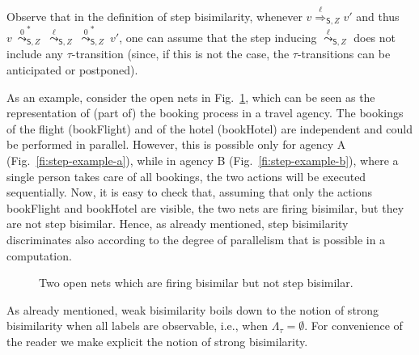 \documentclass{LMCS}
\newcommand{\wltr}[3][x]{\ensuremath{\stackrel{{#3}}{\leadsto}_{\mathsf{#1},#2}}}
\newcommand{\wltrStar}[3][x]{\ensuremath{\stackrel{{#3}}{\leadsto}^*_{\mathsf{#1},#2}}}
\newcommand{\Ltr}[3][x]{\ensuremath{\stackrel{{#3}}{\Longrightarrow}_{\mathsf{#1},#2}}}
\begin{document}
Observe that in the definition of step bisimilarity, whenever $v
\Ltr[S]{Z}{\ell} v'$ and thus $v\ \wltrStar[S]{Z}{0}\ \wltr[S]{Z}{\ell}\
\wltrStar[S]{Z}{0}\ v'$, one can assume that the step inducing
$\wltr[S]{Z}{\ell}$ does not include any $\tau$-transition (since, if
this is not the case, the $\tau$-transitions can be anticipated or
postponed).

As an example, consider the open nets in Fig.~\ref{fi:step-example},
which can be seen as the representation of (part of) the booking
process in a travel agency. The bookings of the flight
(\textsf{bookFlight}) and of the hotel (\textsf{bookHotel}) are
independent and could be performed in parallel. However, this is
possible only for agency A (Fig.~\ref{fi:step-example-a}), while in
agency B (Fig.~\ref{fi:step-example-b}), where a single person takes care
of all bookings, the two actions will be executed sequentially.
Now, it is easy to check that, assuming that only the actions
\textsf{bookFlight} and \textsf{bookHotel} are visible, the two nets
are firing bisimilar, but they are not step bisimilar.
Hence, as already mentioned, step bisimilarity discriminates
also according to the degree of parallelism that is possible in a
computation.

\begin{figure}[t]
  \begin{center}
\hspace{2cm}
\end{center}
\caption{Two open nets which are firing bisimilar but not step bisimilar.}
  \label{fi:step-example}
\end{figure}

As already mentioned, weak bisimilarity boils down to the notion of
strong bisimilarity when all labels are observable, i.e., when
$\Lambda_\tau = \emptyset$.
For convenience of the reader we make explicit the notion of
strong bisimilarity.
\end{document}

